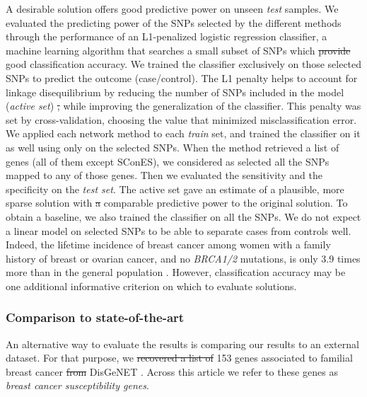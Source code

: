 \documentclass[10pt,letterpaper]{article}
\providecommand{\DIFaddtex}[1]{{\protect\color{blue}\uwave{#1}}} %
\providecommand{\DIFdeltex}[1]{{\protect\color{red}\sout{#1}}}                      %
\providecommand{\DIFaddbegin}{} %
\providecommand{\DIFaddend}{} %
\providecommand{\DIFdelbegin}{} %
\providecommand{\DIFdelend}{} %
\providecommand{\DIFadd}[1]{\texorpdfstring{\DIFaddtex{#1}}{#1}} %
\providecommand{\DIFdel}[1]{\texorpdfstring{\DIFdeltex{#1}}{}} %
\newcommand{\DIFscaledelfig}{0.5}
\newlength{\DIFdelgraphicswidth} %
\newlength{\DIFdelgraphicsheight} %
\newcommand{\DIFaddincludegraphics}[2][]{{\color{blue}\fbox{\DIFOincludegraphics[#1]{#2}}}} %
\newcommand{\DIFdelincludegraphics}[2][]{%
\sbox{\DIFdelgraphicsbox}{\DIFOincludegraphics[#1]{#2}}%
\settoboxwidth{\DIFdelgraphicswidth}{\DIFdelgraphicsbox} %
\settoboxtotalheight{\DIFdelgraphicsheight}{\DIFdelgraphicsbox} %
\scalebox{\DIFscaledelfig}{%
\parbox[b]{\DIFdelgraphicswidth}{\usebox{\DIFdelgraphicsbox}\\[-\baselineskip] \rule{\DIFdelgraphicswidth}{0em}}\llap{\resizebox{\DIFdelgraphicswidth}{\DIFdelgraphicsheight}{%
\setlength{\unitlength}{\DIFdelgraphicswidth}%
\begin{picture}(1,1)%
\thicklines\linethickness{2pt} %
{\color[rgb]{1,0,0}\put(0,0){\framebox(1,1){}}}%
{\color[rgb]{1,0,0}\put(0,0){\line( 1,1){1}}}%
{\color[rgb]{1,0,0}\put(0,1){\line(1,-1){1}}}%
\end{picture}%
}\hspace*{3pt}}} %
} %
\DeclareRobustCommand{\DIFaddbegin}{\DIFOaddbegin \let\includegraphics\DIFaddincludegraphics} %
\DeclareRobustCommand{\DIFaddend}{\DIFOaddend \let\includegraphics\DIFOincludegraphics} %
\DeclareRobustCommand{\DIFdelbegin}{\DIFOdelbegin \let\includegraphics\DIFdelincludegraphics} %
\DeclareRobustCommand{\DIFdelend}{\DIFOaddend \let\includegraphics\DIFOincludegraphics} %
\begin{document}
A desirable solution offers good predictive power on unseen \emph{test} samples. We evaluated the predicting power of the SNPs selected by the different methods through the performance of an L1-penalized logistic regression classifier, a machine learning algorithm that searches a small subset of SNPs which \DIFdelbegin \DIFdel{provide }\DIFdelend \DIFaddbegin \DIFadd{provides }\DIFaddend good classification accuracy. We trained the classifier exclusively on those selected SNPs to predict the outcome (case/control). The L1 penalty helps to account for linkage disequilibrium by reducing the number of SNPs included in the model (\emph{active set}) \DIFdelbegin \DIFdel{, }\DIFdelend while improving the generalization of the classifier. This penalty was set by cross-validation, choosing the value that minimized misclassification error. We applied each network method to each \emph{train} set, and trained the classifier on it as well using only on the selected SNPs. When the method retrieved a list of genes (all of them except SConES), we considered as selected all the SNPs mapped to any of those genes. Then we evaluated the sensitivity and the specificity on the \emph{test set}. The active set gave an estimate of a plausible, more sparse solution with \DIFdelbegin \DIFdel{a }\DIFdelend comparable predictive power to the original solution. To obtain a baseline, we also trained the classifier on all the SNPs. We do not expect a linear model on selected SNPs to be able to separate cases from controls well. Indeed, the lifetime incidence of breast cancer among women with a family history of breast or ovarian cancer, and no \emph{BRCA1/2} mutations, is only 3.9 times more than in the general population \cite{Metcalfe2008}. However, classification accuracy may be one additional informative criterion on which to evaluate solutions.

\subsubsection{Comparison to state-of-the-art}
\label{methods:bcac}

An alternative way to evaluate the results is \DIFaddbegin \DIFadd{by }\DIFaddend comparing our results to an external dataset. For that purpose, we \DIFdelbegin \DIFdel{recovered a list of }\DIFdelend \DIFaddbegin \DIFadd{used the }\DIFaddend 153 genes associated to familial breast cancer \DIFdelbegin \DIFdel{from }\DIFdelend \DIFaddbegin \DIFadd{on }\DIFaddend DisGeNET \cite{pinero_disgenet:_2017}. Across this article we refer to these genes as \emph{breast cancer susceptibility genes}.
\end{document}
